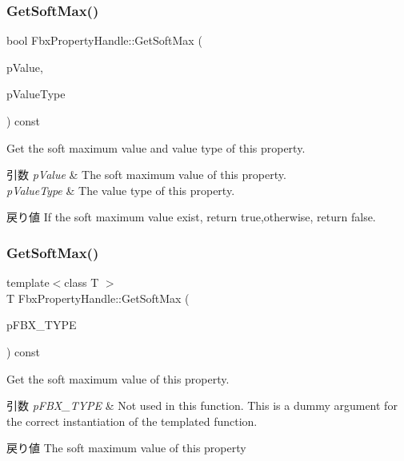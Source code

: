 \subsubsection{\texorpdfstring{Get\+Soft\+Max()}{GetSoftMax()}\hspace{0.1cm}{\footnotesize\ttfamily [1/2]}}
{\footnotesize\ttfamily bool Fbx\+Property\+Handle\+::\+Get\+Soft\+Max (\begin{DoxyParamCaption}\item[{void $\ast$}]{p\+Value,  }\item[{\hyperlink{fbxpropertytypes_8h_a73913a5ddfb20e57c6f25e9e6784bd92}{E\+Fbx\+Type}}]{p\+Value\+Type }\end{DoxyParamCaption}) const}

Get the soft maximum value and value type of this property. 
\begin{DoxyParams}{引数}
{\em p\+Value} & The soft maximum value of this property. \\
\hline
{\em p\+Value\+Type} & The value type of this property. \\
\hline
\end{DoxyParams}
\begin{DoxyReturn}{戻り値}
If the soft maximum value exist, return true,otherwise, return false. 
\end{DoxyReturn}
\mbox{\label{class_fbx_property_handle_a302beaa7745f9f5f3cd92e7b4f42d576}} 
\subsubsection{\texorpdfstring{Get\+Soft\+Max()}{GetSoftMax()}\hspace{0.1cm}{\footnotesize\ttfamily [2/2]}}
{\footnotesize\ttfamily template$<$class T $>$ \\
T Fbx\+Property\+Handle\+::\+Get\+Soft\+Max (\begin{DoxyParamCaption}\item[{const T $\ast$}]{p\+F\+B\+X\+\_\+\+T\+Y\+PE }\end{DoxyParamCaption}) const\hspace{0.3cm}{\ttfamily [inline]}}

Get the soft maximum value of this property. 
\begin{DoxyParams}{引数}
{\em p\+F\+B\+X\+\_\+\+T\+Y\+PE} & Not used in this function. This is a dummy argument for the correct instantiation of the templated function. \\
\hline
\end{DoxyParams}
\begin{DoxyReturn}{戻り値}
The soft maximum value of this property 
\end{DoxyReturn}


